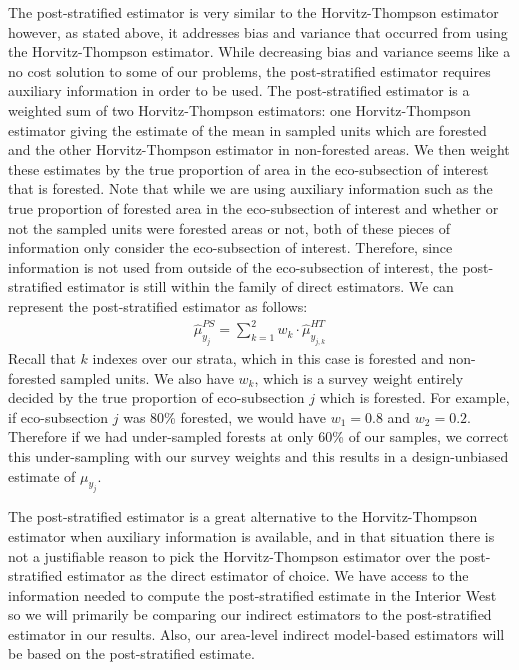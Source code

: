 \documentclass[12pt,twoside]{reedthesis}
\begin{document}
The post-stratified estimator is very similar to the Horvitz-Thompson estimator however, as stated above, it addresses bias and variance that occurred from using the Horvitz-Thompson estimator. While decreasing bias and variance seems like a no cost solution to some of our problems, the post-stratified estimator requires auxiliary information in order to be used. The post-stratified estimator is a weighted sum of two Horvitz-Thompson estimators: one Horvitz-Thompson estimator giving the estimate of the mean in sampled units which are forested and the other Horvitz-Thompson estimator in non-forested areas. We then weight these estimates by the true proportion of area in the eco-subsection of interest that is forested. Note that while we are using auxiliary information such as the true proportion of forested area in the eco-subsection of interest and whether or not the sampled units were forested areas or not, both of these pieces of information only consider the eco-subsection of interest. Therefore, since information is not used from outside of the eco-subsection of interest, the post-stratified estimator is still within the family of direct estimators. We can represent the post-stratified estimator as follows:
\begin{align}
\hat\mu_{y_j}^{PS} = \sum_{k=1}^{2} w_k \cdot \hat\mu_{y_{j,k}}^{HT}
\end{align}
Recall that \(k\) indexes over our strata, which in this case is forested and non-forested sampled units. We also have \(w_k\), which is a survey weight entirely decided by the true proportion of eco-subsection \(j\) which is forested. For example, if eco-subsection \(j\) was 80\% forested, we would have \(w_1 = 0.8\) and \(w_2 = 0.2\). Therefore if we had under-sampled forests at only 60\% of our samples, we correct this under-sampling with our survey weights and this results in a design-unbiased estimate of \(\mu_{y_j}\).

The post-stratified estimator is a great alternative to the Horvitz-Thompson estimator when auxiliary information is available, and in that situation there is not a justifiable reason to pick the Horvitz-Thompson estimator over the post-stratified estimator as the direct estimator of choice. We have access to the information needed to compute the post-stratified estimate in the Interior West so we will primarily be comparing our indirect estimators to the post-stratified estimator in our results. Also, our area-level indirect model-based estimators will be based on the post-stratified estimate.
\end{document}
